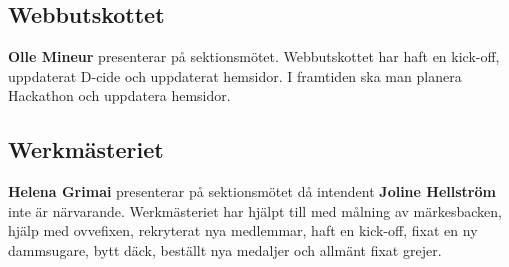 \documentclass[../protokoll_hostmote_2021.tex]{subfiles}
\begin{document}
\subsection{Webbutskottet}
\textbf{Olle Mineur} presenterar på sektionsmötet. Webbutskottet har haft en kick-off, uppdaterat D-cide och uppdaterat hemsidor. I framtiden ska man planera Hackathon och uppdatera hemsidor.



\subsection{Werkmästeriet}
 \textbf{Helena Grimai} presenterar på sektionsmötet då intendent \textbf{Joline Hellström} inte är närvarande. Werkmästeriet har hjälpt till med målning av märkesbacken, hjälp med ovvefixen, rekryterat nya medlemmar, haft en kick-off, fixat en ny dammsugare, bytt däck, beställt nya medaljer och allmänt fixat grejer.
\end{document}
